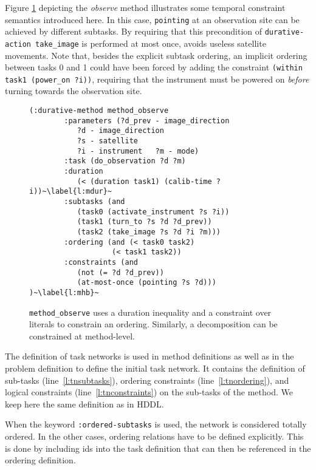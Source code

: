 \documentclass[letterpaper]{article} %
\begin{document}
Figure \ref{pddl_durative_m_con} depicting the \textit{observe} method illustrates some temporal constraint semantics introduced here.
In this case, \texttt{pointing} at an observation site can be achieved by different subtasks. By requiring that this precondition of \mbox{\small\lstinline[language={pddl},basicstyle=\ttfamily]|durative-action take_image|} is performed  at most once, avoids useless satellite movements.
Note that, besides the explicit subtask ordering, an implicit ordering between tasks 0 and 1 could have been forced by adding the constraint  \mbox{\small\lstinline[language={pddl},basicstyle=\ttfamily]|(within task1 (power_on ?i))|}, requiring that the instrument must be powered on \emph{before} turning towards the observation site.
%
\begin{figure}[h!]
	\begin{lstlisting}[language=pddl, basicstyle=\fontsize{8.5}{10}\selectfont\ttfamily, escapechar=~]
	(:durative-method method_observe
		:parameters (?d_prev - image_direction
		   ?d - image_direction
		   ?s - satellite
		   ?i - instrument   ?m - mode)
		:task (do_observation ?d ?m)
		:duration
		   (< (duration task1) (calib-time ?i))~\label{l:mdur}~
		:subtasks (and
		   (task0 (activate_instrument ?s ?i))
		   (task1 (turn_to ?s ?d ?d_prev))
		   (task2 (take_image ?s ?d ?i ?m)))
		:ordering (and (< task0 task2)
                   (< task1 task2))
		:constraints (and
		   (not (= ?d ?d_prev))
		   (at-most-once (pointing ?s ?d))) )~\label{l:mhb}~
	\end{lstlisting}
	\caption{\texttt{method\_observe} uses a duration inequality and a constraint over literals to constrain an ordering. Similarly, a decomposition can be constrained at method-level.\label{pddl_durative_m_con}}
\end{figure}


%
%
The definition of task networks is used in method definitions as well as in the problem definition to define the initial task network. It contains the definition of sub-tasks (line~\ref{l:tnsubtasks}), ordering constraints (line~\ref{l:tnordering}), and logical constraints (line~\ref{l:tnconstraints}) on the sub-tasks of the method. We keep here the same definition as in HDDL.

When the keyword \verb+:ordered-subtasks+ is used, the network is considered totally ordered. In the other cases, ordering relations have to be defined explicitly. This is done by including ids into the task definition that can then be referenced in the ordering definition.
\end{document}
